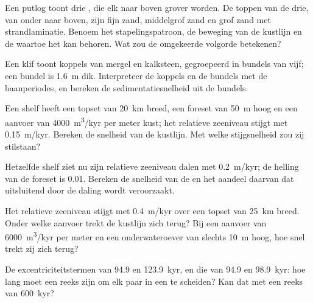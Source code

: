 \begin{exercise}[$\star$]\label{exo:b3:sequence-stratigraphy:3}
Een putlog toont drie , die elk naar boven grover worden. De toppen van
de drie, van onder naar boven, zijn fijn zand, middelgrof zand en grof zand met
strandlaminatie. Benoem het stapelingspatroon, de beweging van de kustlijn en de
 waartoe het kan behoren. Wat zou de omgekeerde volgorde betekenen?
\end{exercise}

\begin{exercise}[$\star$]\label{exo:b3:sequence-stratigraphy:4}
Een klif toont koppels van mergel en kalksteen, gegroepeerd in bundels van vijf; een
bundel is \qty{1.6}{m} dik. Interpreteer de koppels en de bundels met de
baanperiodes, en bereken de sedimentatiesnelheid uit de bundels.
\end{exercise}

\begin{exercise}[$\star\star$]\label{exo:b3:sequence-stratigraphy:5}
Een shelf heeft een topset van \qty{20}{km} breed, een foreset van \qty{50}{m} hoog en een
aanvoer van \qty{4000}{m^3/kyr} per meter kust; het relatieve zeeniveau stijgt
met \qty{0.15}{m/kyr}. Bereken de snelheid van de kustlijn. Met welke
stijgsnelheid zou zij stilstaan?
\end{exercise}

\begin{exercise}[$\star\star$]\label{exo:b3:sequence-stratigraphy:6}
Hetzelfde shelf ziet nu zijn relatieve zeeniveau dalen met \qty{0.2}{m/kyr}; de
helling van de foreset is 0.01. Bereken de snelheid van de  en het
aandeel daarvan dat uitsluitend door de daling wordt veroorzaakt.
\end{exercise}

\begin{exercise}[$\star\star$]\label{exo:b3:sequence-stratigraphy:7}
Het relatieve zeeniveau stijgt met \qty{0.4}{m/kyr} over een topset van \qty{25}{km} breed.
Onder welke aanvoer trekt de kustlijn zich terug? Bij een aanvoer van
\qty{6000}{m^3/kyr} per meter en een onderwateroever van slechts \qty{10}{m} hoog, hoe
snel trekt zij zich terug?
\end{exercise}

\begin{exercise}[$\star\star$]\label{exo:b3:sequence-stratigraphy:8}
De excentriciteitstermen van 94.9 en \qty{123.9}{kyr}, en die van 94.9 en
\qty{98.9}{kyr}: hoe lang moet een reeks zijn om elk paar in een
 te scheiden? Kan dat met een reeks van \qty{600}{kyr}?
\end{exercise}

